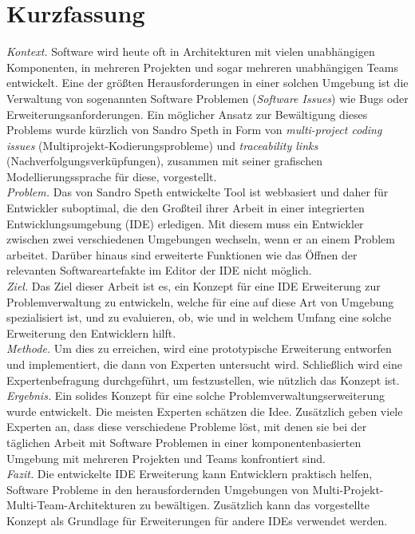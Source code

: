 \documentclass[
  a4paper,  %
  twoside,  %
  bibliography=totoc,
  headsepline,
  cleardoublepage=empty,
  parskip=half,
  draft=false
]{scrbook}
\begin{document}
\section*{Kurzfassung}
\textit{Kontext.} Software wird heute oft in Architekturen mit vielen unabhängigen Komponenten, in mehreren Projekten und sogar mehreren unabhängigen Teams entwickelt. 
Eine der größten Herausforderungen in einer solchen Umgebung ist die Verwaltung von sogenannten Software Problemen (\textit{Software Issues}) wie Bugs oder Erweiterungsanforderungen. 
Ein möglicher Ansatz zur Bewältigung dieses Problems wurde kürzlich von Sandro Speth in Form von \textit{multi-project coding issues} (Multiprojekt-Kodierungsprobleme) und \textit{traceability links} (Nachverfolgungsverküpfungen), zusammen mit seiner grafischen Modellierungssprache für diese, vorgestellt. \\
\textit{Problem.} Das von Sandro Speth entwickelte Tool ist webbasiert und daher für Entwickler suboptimal, 
die den Großteil ihrer Arbeit in einer integrierten Entwicklungsumgebung (IDE) erledigen. 
Mit diesem muss ein Entwickler zwischen zwei verschiedenen Umgebungen wechseln, wenn er an einem Problem arbeitet. 
Darüber hinaus sind erweiterte Funktionen wie das Öffnen der relevanten Softwareartefakte im Editor der IDE nicht möglich. \\
\textit{Ziel.} Das Ziel dieser Arbeit ist es, ein Konzept für eine IDE Erweiterung zur Problemverwaltung zu entwickeln, welche für eine auf diese Art von Umgebung spezialisiert ist, und zu evaluieren, ob, wie und in welchem Umfang eine solche Erweiterung den Entwicklern hilft. \\
\textit{Methode.} Um dies zu erreichen, wird eine prototypische Erweiterung entworfen und implementiert, die dann von Experten untersucht wird.
Schließlich wird eine Expertenbefragung durchgeführt, um festzustellen, wie nützlich das Konzept ist. \\
\textit{Ergebnis.} Ein solides Konzept für eine solche Problemverwaltungserweiterung wurde entwickelt. 
Die meisten Experten schätzen die Idee. Zusätzlich geben viele Experten an, dass diese verschiedene Probleme löst, mit denen sie bei der täglichen Arbeit mit Software Problemen in einer komponentenbasierten Umgebung mit mehreren Projekten und Teams konfrontiert sind.\\
\textit{Fazit.} Die entwickelte \gls{IDE} Erweiterung kann Entwicklern praktisch helfen, Software Probleme in den herausfordernden Umgebungen von Multi-Projekt-Multi-Team-Architekturen zu bewältigen. Zusätzlich kann das vorgestellte Konzept als Grundlage für Erweiterungen für andere IDEs verwendet werden.
\cleardoublepage
\end{document}
